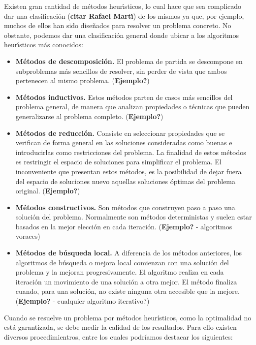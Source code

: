 \documentclass[a4paper, 12pt, oneside]{book}
\begin{document}
	Existen gran cantidad de m\'etodos heur\'{\i}sticos, lo cual hace que sea complicado dar una clasificaci\'on (\textbf{citar Rafael Mart\'{\i}}) de los mismos ya que, por ejemplo, muchos de ellos han sido dise\~{n}ados para resolver un problema concreto. No obstante, podemos dar una clasificaci\'on general donde ubicar a los algoritmos heur\'{\i}sticos m\'as conocidos:
	
	\begin{itemize}
		\item \textbf{M\'etodos de descomposici\'on.} El problema de partida se descompone en subproblemas m\'as sencillos de resolver, sin perder de vista que ambos pertenecen al mismo problema. (\textbf{Ejemplo?})
		\item \textbf{M\'etodos inductivos.} Estos m\'etodos parten de casos m\'as sencillos del problema general, de manera que analizan propiedades o t\'ecnicas que pueden generalizarse al problema completo. (\textbf{Ejemplo?})
		\item \textbf{M\'etodos de reducci\'on.} Consiste en seleccionar propiedades que se verifican de forma general en las soluciones consideradas como buenas e introducirlas como restricciones del problema. La finalidad de estos m\'etodos es restringir el espacio de soluciones para simplificar el problema. El inconveniente que presentan estos m\'etodos, es la posibilidad de dejar fuera del espacio de soluciones nuevo aquellas soluciones \'optimas del problema original. (\textbf{Ejemplo?})
		\item \textbf{M\'etodos constructivos.} Son m\'etodos que construyen paso a paso una soluci\'on del problema. Normalmente son m\'etodos deterministas y suelen estar basados en la mejor elecci\'on en cada iteraci\'on. (\textbf{Ejemplo?} - algoritmos voraces)
		\item \textbf{M\'etodos de b\'usqueda local.} A diferencia de los m\'etodos anteriores, los algoritmos de b\'usqueda o mejora local comienzan con una soluci\'on del problema y la mejoran progresivamente. El algoritmo realiza en cada iteraci\'on un movimiento de una soluci\'on a otra mejor. El m\'etodo finaliza cuando, para una soluci\'on, no existe ninguna otra accesible que la mejore. (\textbf{Ejemplo?} - cualquier algoritmo iterativo?)
	\end{itemize}
	
	Cuando se resuelve un problema por m\'etodos heur\'isticos, como la optimalidad no est\'a garantizada, se debe medir la calidad de los resultados. Para ello existen diversos procedimientros, entre los cuales podr\'iamos destacar los siguientes:
	
\end{document}
